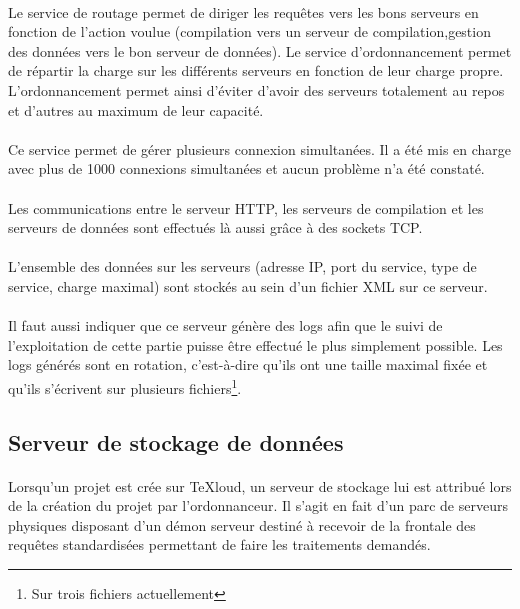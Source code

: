 \documentclass[a4paper,12pt]{article}
\begin{document}
\paragraph*{}
Le service de routage permet de diriger les requêtes vers les bons serveurs en fonction de l'action voulue (compilation vers un serveur de compilation,gestion des données vers le bon serveur de données). Le service d'ordonnancement permet de répartir la charge sur les différents serveurs en fonction de leur charge propre. L'ordonnancement permet ainsi d'éviter d'avoir des serveurs totalement au repos et d'autres au maximum de leur capacité.

\paragraph*{}
Ce service permet de gérer plusieurs connexion simultanées. Il a été mis en charge avec plus de 1000 connexions simultanées et aucun problème n'a été constaté.

\paragraph*{}
Les communications entre le serveur HTTP, les serveurs de compilation et les serveurs de données sont effectués là aussi grâce à des sockets TCP.

\paragraph*{}
L'ensemble des données sur les serveurs (adresse IP, port du service, type de service, charge maximal) sont stockés au sein d'un fichier XML sur ce serveur.

\paragraph*{}
Il faut aussi indiquer que ce serveur génère des logs afin que le suivi de l'exploitation de cette partie puisse être effectué le plus simplement possible. Les logs générés sont en rotation, c'est-à-dire qu'ils ont une taille maximal fixée et qu'ils s'écrivent sur plusieurs fichiers\footnote{Sur trois fichiers actuellement}.


\subsection{Serveur de stockage de données}
\paragraph*{}
Lorsqu'un projet est crée sur TeXloud, un serveur de stockage lui est attribué lors de la création du projet par l'ordonnanceur.
Il s'agit en fait d'un parc de serveurs physiques disposant d'un démon serveur destiné à recevoir de la frontale des requêtes standardisées permettant de faire les traitements demandés.
\end{document}
